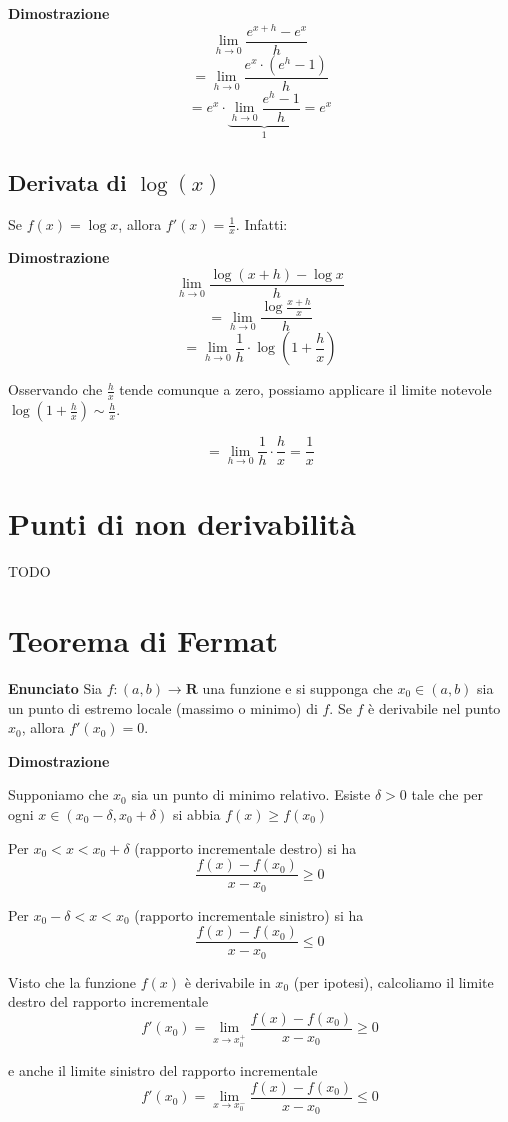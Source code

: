 \textbf{Dimostrazione}
$$
\lim_{h \to 0} \frac{e^{x+h} - e^x}{h} $$ $$
= \lim_{h \to 0} \frac{e^x \cdot (e^h - 1)}{h} $$ $$
= e^x \cdot \underbrace{\lim_{h \to 0} \frac{e^h - 1}{h}}_{1} = e^x
$$

\subsection{Derivata di $\log(x)$}
Se $f(x) = \log x$, allora $f'(x) = \frac{1}{x}$. Infatti:

\textbf{Dimostrazione}
$$\lim_{h \to 0} \frac{\log (x+h) - \log x}{h} $$ $$
= \lim_{h \to 0} \frac{\log \frac{x+h}{x}}{h} $$ $$
= \lim_{h \to 0} \frac{1}{h} \cdot \log \left(1 + \frac{h}{x} \right) $$

Osservando che $\frac{h}{x}$ tende comunque a zero, possiamo applicare il limite notevole $\log (1 + \frac{h}{x} ) \sim \frac{h}{x}$.

$$= \lim_{h \to 0} \frac{1}{h} \cdot \frac{h}{x} = \frac{1}{x}$$

\section{Punti di non derivabilità}

TODO

\section{Teorema di Fermat}

\textbf{Enunciato}
Sia $f: (a,b)\to\textbf{R}$ una funzione e si supponga che $x_0 \in (a,b)$ sia un punto di estremo locale (massimo o minimo) di $f$. Se $f$ è derivabile nel punto $x_0$, allora $f'(x_0)=0$.

\textbf{Dimostrazione}

Supponiamo che $x_0$ sia un punto di minimo relativo. Esiste $\delta > 0$ tale che per ogni $x \in (x_0-\delta, x_0+\delta)$ si abbia $f(x)\geq f(x_0)$

Per $x_0<x<x_0+\delta$ (rapporto incrementale destro)  si ha $$ \frac{f(x)-f(x_0)}{x-x_0} \geq 0$$

Per $x_0-\delta<x<x_0$ (rapporto incrementale sinistro) si ha $$ \frac{f(x)-f(x_0)}{x-x_0} \leq 0$$

Visto che la funzione $f(x)$ è derivabile in $x_0$ (per ipotesi), calcoliamo il limite destro del rapporto incrementale $$f'(x_0) = \lim_{x\to x^+_0}\frac{f(x)-f(x_0)}{x-x_0} \geq 0$$

e anche il limite sinistro del rapporto incrementale $$f'(x_0) = \lim_{x\to x^-_0}\frac{f(x)-f(x_0)}{x-x_0} \leq 0$$

